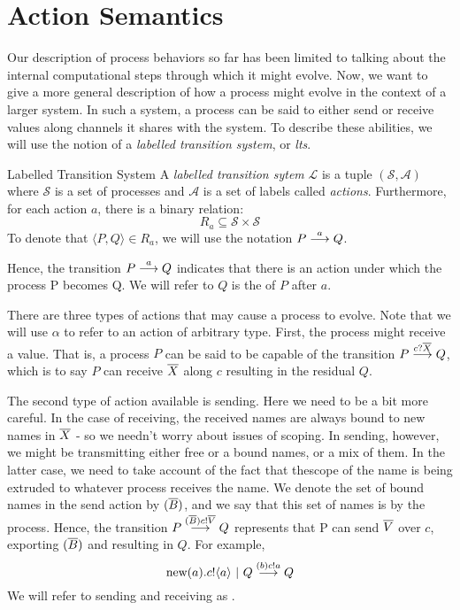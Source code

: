 \section{Action Semantics}
Our description of process behaviors so far has been limited to talking about the internal computational steps through which it might evolve.  Now, we want to give a more general description of how a process might evolve in the context of a larger system.  In such a system, a process can be said to either send or receive values along channels it shares with the system.  To describe these abilities, we will use the notion of a \emph{labelled transition system}, or \emph{lts}.

\begin{definition}{Labelled Transition System}
	A \emph{labelled transition sytem} $\mathcal{L}$ is a tuple $(\mathcal{S}, \mathcal{A})$ 
where $\mathcal{S}$ is a set of processes and $\mathcal{A}$ is a set of labels called \emph{actions}.  Furthermore, for each action $a$, there is a binary relation:
	\[
		R_a \subseteq \mathcal{S} \times \mathcal{S}
	\]
	To denote that $\langle P,Q\rangle \in R_a$, we will use the notation $P \overset{{a}}{\longrightarrow} Q$.
\end{definition}
Hence, the transition $P \overset{{a}}{\longrightarrow} Q$ indicates that there is an action under which the process P becomes Q.  We will refer to $Q$ is the  of $P$ after $a$.

There are three types of actions that may cause a process to evolve.  Note that we will use $\alpha$ to refer to an action of arbitrary type.  First, the process might receive a value.  That is, a process $P$ can be said to be capable of the transition $P \overset{{{c}?{\overline{X}}}}{\longrightarrow} Q$, which is to say $P$ can receive $\overline{X}$ along $c$ resulting in the residual $Q$.

The second type of action available is sending.  Here we need to be a bit more careful.  In the case of receiving, the received names are always bound to new names in $\overline{X}$ - so we needn't worry about issues of scoping.  In sending, however, we might be transmitting either free or a bound names, or a mix of them.  In the latter case, we need to take account of the fact that thescope of the name is being extruded to whatever process receives the name.  We denote the set of bound names in the send action by $({\overline{B}})$, and we say that this set of names is  by the process.  Hence, the transition $P \overset{{({\overline{B}}){c}!{\overline{V}}}}{\longrightarrow} Q$ represents that P can send $\overline{V}$ over $c$, exporting $({\overline{B}})$ and resulting in $Q$.  For example,
\[
	\text{new}({a}).{c}!\langle{a}\rangle \ |\  Q \overset{{({b}){c}!{a}}}{\longrightarrow} Q
\]
We will refer to sending and receiving as .

